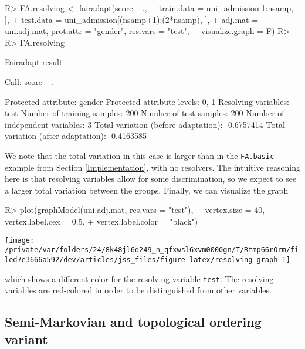 \documentclass[
  notitle]{jss}
\begin{document}
\begin{CodeChunk}
\begin{CodeInput}
R> FA.resolving <- fairadapt(score ~ .,
+   train.data = uni_admission[1:nsamp, ],
+   test.data = uni_admission[(nsamp+1):(2*nsamp), ],
+   adj.mat = uni.adj.mat, prot.attr = "gender", res.vars = "test",
+   visualize.graph = F)
R> 
R> FA.resolving
\end{CodeInput}
\begin{CodeOutput}
Fairadapt result

Call:
 score ~ . 

Protected attribute:                  gender 
Protected attribute levels:           0, 1 
Resolving variables:                  test 
Number of training samples:           200 
Number of test samples:               200 
Number of independent variables:      3 
Total variation (before adaptation):  -0.6757414 
Total variation (after adaptation):   -0.4163585 
\end{CodeOutput}
\end{CodeChunk}

We note that the total variation in this case is larger than in the
\texttt{FA.basic} example from Section \ref{Implementation}, with no
resolvers. The intuitive reasoning here is that resolving variables
allow for some discrimination, so we expect to see a larger total
variation between the groups. Finally, we can visualize the graph

\begin{CodeChunk}
\begin{CodeInput}
R> plot(graphModel(uni.adj.mat, res.vars = "test"),
+   vertex.size = 40, vertex.label.cex = 0.5,
+   vertex.label.color = "black")
\end{CodeInput}


\begin{center}\texttt{[image: /private/var/folders/24/8k48jl6d249\_n\_qfxwsl6xvm0000gn/T/Rtmp66rOrm/filed7e3666a592/dev/articles/jss\_files/figure-latex/resolving-graph-1]} \end{center}

\end{CodeChunk}

which shows a different color for the resolving variable \texttt{test}.
The resolving variables are red-colored in order to be distinguished
from other variables.

\hypertarget{semi-markovian-and-topological-ordering-variant}{%
\subsection{Semi-Markovian and topological ordering
variant}\label{semi-markovian-and-topological-ordering-variant}}
\end{document}
